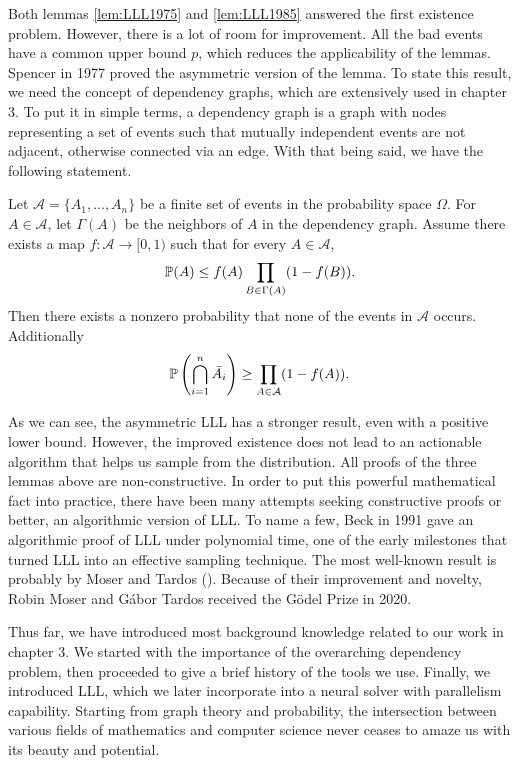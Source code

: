 Both lemmas \ref{lem:LLL1975} and \ref{lem:LLL1985} answered the first existence
problem. However, there is a lot of room for improvement. All the bad events
have a common upper bound $p$, which reduces the applicability of the lemmas.
Spencer in 1977 proved the asymmetric version of the lemma. To state this
result, we need the concept of dependency graphs, which are extensively used
in chapter 3. To put it in simple terms, a dependency graph is a graph with nodes
representing a set of events such that mutually independent events are not
adjacent, otherwise connected via an edge. With that being said, we have the
following statement.

\begin{lemma}
    Let $\mathcal{A} = \{A_1, \dots, A_n\}$ be a finite set of events in the probability space $\Omega$. For $A \in \mathcal{A}$, let $\Gamma(A)$ be the neighbors of $A$ in the dependency graph. Assume there exists a map $f: \mathcal{A} \to [0,1)$ such that for every $A \in \mathcal{A}$,
    \begin{align}
        \mathbb{P}(A) \leq f(A) \prod_{B \in \Gamma(A)} (1-f(B)).
    \end{align}
    Then there exists a nonzero probability that none of the events in $\mathcal{A}$ occurs. Additionally
    \begin{align}
        \mathbb{P}\left(\bigcap_{i=1}^n \bar{A_i} \right) \geq \prod_{A \in \mathcal{A}} (1-f(A)).
    \end{align}
\end{lemma}

As we can see, the asymmetric LLL has a stronger result, even with a positive
lower bound. However, the improved existence does not lead to an actionable
algorithm that helps us sample from the distribution. All proofs of the three
lemmas above are non-constructive. In order to put this powerful mathematical
fact into practice, there have been many attempts seeking constructive
proofs or better, an algorithmic version of LLL. To name a few, Beck in 1991
gave an algorithmic proof of LLL under polynomial time, one of the early
milestones that turned LLL into an effective sampling technique. The most
well-known result is probably by Moser and Tardos
(\cite{moser2009constructiveproofgenerallovasz}). Because of their improvement
and novelty, Robin Moser and Gábor Tardos received the Gödel Prize in 2020.

Thus far, we have introduced most background knowledge related to our work in
chapter 3. We started with the importance of the overarching dependency
problem, then proceeded to give a brief history of the tools we use. Finally,
we introduced LLL, which we later incorporate into a neural solver with
parallelism capability. Starting from graph theory and probability, the
intersection between various fields of mathematics and computer science never
ceases to amaze us with its beauty and potential.

